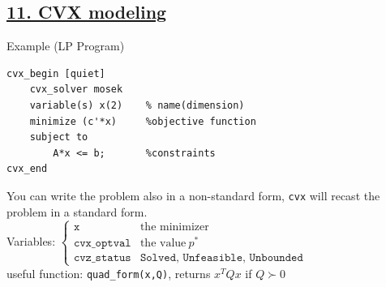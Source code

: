 \documentclass[a4paper]{article}
\begin{document}
\subsection*{\underline{11. CVX modeling}}
\begin{multicols}{2}
    \noindent
Example (LP Program)
\begin{verbatim}
cvx_begin [quiet]
    cvx_solver mosek        
    variable(s) x(2)    % name(dimension)
    minimize (c'*x)     %objective function
    subject to             
        A*x <= b;       %constraints
cvx_end 
\end{verbatim}
    \newcolumn
    You can write the problem also in a non-standard form, \texttt{cvx} will recast the problem in a standard form. \\
    Variables: $\begin{cases}
        \texttt{x}&\text{the minimizer}\\
        \texttt{cvx\_optval}&\text{the value} \ p^*\\
        \texttt{cvz\_status}&\texttt{Solved, Unfeasible, Unbounded}
    \end{cases}$\\

    \noindent
    useful function: \texttt{quad\_form(x,Q)}, returns $x^T{Q}x$ if $Q\succ0$
\end{multicols}
\end{document}
